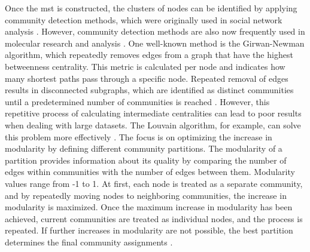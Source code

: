 Once the \acrshort{mst} is constructed, the clusters of nodes can be identified by applying community detection methods, which were originally used in social network analysis \cite{Liu1, Vas1}. However, community detection methods are also now frequently used in molecular research and analysis \cite{Liu1}. One well-known method is the Girwan-Newman algorithm, which repeatedly removes edges from a graph that have the highest betweenness centrality. This metric is calculated per node and indicates how many shortest paths pass through a specific node. Repeated removal of edges results in disconnected subgraphs, which are identified as distinct communities until a predetermined number of communities is reached \cite{Hub1}. However, this repetitive process of calculating intermediate centralities can lead to poor results when dealing with large datasets. The Louvain algorithm, for example, can solve this problem more effectively \cite{Blo1}. The focus is on optimizing the increase in modularity by defining different community partitions. The modularity of a partition provides information about its quality by comparing the number of edges within communities with the number of edges between them. Modularity values range from -1 to 1.
At first, each node is treated as a separate community, and by repeatedly moving nodes to neighboring communities, the increase in modularity is maximized. Once the maximum increase in modularity has been achieved, current communities are treated as individual nodes, and the process is repeated. If further increases in modularity are not possible, the best partition determines the final community assignments \cite{Blo1}.

